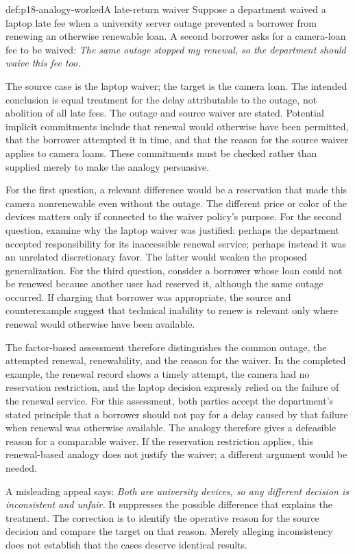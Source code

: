 \begin{hbexample}{def:p18-analogy-worked}{A late-return waiver}
Suppose a department waived a laptop late fee when a university server
outage prevented a borrower from renewing an otherwise renewable loan.
A second borrower asks for a camera-loan fee to be waived:
\emph{The same outage stopped my renewal, so the department should
waive this fee too.}

The source case is the laptop waiver; the target is the camera loan.
The intended conclusion is equal treatment for the delay attributable
to the outage, not abolition of all late fees.
The outage and source waiver are stated. Potential implicit commitments
include that renewal would otherwise have been permitted, that the
borrower attempted it in time, and that the reason for the source waiver
applies to camera loans. These commitments must be checked rather
than supplied merely to make the analogy persuasive.

For the first question, a relevant difference would be a reservation
that made this camera nonrenewable even without the outage.
The different price or color of the devices matters only if connected
to the waiver policy's purpose.
For the second question, examine why the laptop waiver was justified:
perhaps the department accepted responsibility for its inaccessible
renewal service; perhaps instead it was an unrelated discretionary favor.
The latter would weaken the proposed generalization.
For the third question, consider a borrower whose loan could not be
renewed because another user had reserved it, although the same outage
occurred. If charging that borrower was appropriate, the source and
counterexample suggest that technical inability to renew is relevant
only where renewal would otherwise have been available.

The factor-based assessment therefore distinguishes the common outage,
the attempted renewal, renewability, and the reason for the waiver.
In the completed example, the renewal record shows a timely attempt,
the camera had no reservation restriction, and the laptop decision
expressly relied on the failure of the renewal service.
For this assessment, both parties accept the department's stated
principle that a borrower should not pay for a delay caused by that
failure when renewal was otherwise available.
The analogy therefore gives a defeasible reason for a comparable waiver.
If the reservation restriction applies, this renewal-based analogy
does not justify the waiver; a different argument would be needed.

A misleading appeal says:
\emph{Both are university devices, so any different decision is
inconsistent and unfair.}
It suppresses the possible difference that explains the treatment.
The correction is to identify the operative reason for the source
decision and compare the target on that reason. Merely alleging
inconsistency does not establish that the cases deserve identical results.
\end{hbexample}

